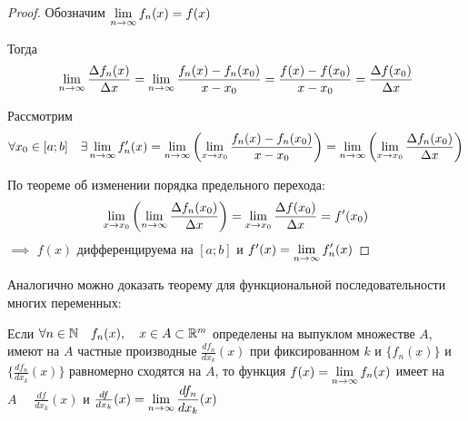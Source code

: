 \begin{proof}
    Обозначим $\displaystyle\lim_{n \to \infty} f_n(x) = f(x)$

    Тогда
    \[
        \displaystyle\lim_{n \to \infty} \frac{\Delta f_n(x)}{\Delta x}
        = \displaystyle\lim_{n \to \infty} \frac{f_n(x) - f_n(x_0)}{x - x_0}
        = \frac{f(x) - f(x_0)}{x - x_0} = \frac{\Delta f(x_0)}{\Delta x}
    \]

    Рассмотрим 
    \[
        \forall x_0 \in [a; b] \quad \exists \displaystyle\lim_{n \to \infty} f_n'(x)
        = \displaystyle\lim_{n \to \infty} \left( \displaystyle\lim_{x \to x_0} \frac{f_n(x) - f_n(x_0)}{x - x_0} \right)
        = \displaystyle\lim_{n \to \infty} \left( \displaystyle\lim_{x \to x_0} \frac{\Delta f_n(x_0)}{\Delta x} \right)
    \]

    По теореме об изменении порядка предельного перехода:
    \[
        \displaystyle\lim_{x \to x_0} \left( \displaystyle\lim_{n \to \infty} \frac{\Delta f_n(x_0)}{\Delta x} \right)
        = \displaystyle\lim_{x \to x_0} \frac{\Delta f(x_0)}{\Delta x} = f'(x_0)
    \]
    $\implies$ $f(x)$ дифференцируема на $[a; b]$ и $f'(x) = \displaystyle\lim_{n \to \infty} f_n'(x)$
\end{proof}

\begin{remark}
    Аналогично можно доказать теорему для функциональной последовательности
    многих переменных:

    Если $\forall n \in \mathbb{N} \quad f_n(x), \quad x \in A \subset \mathbb{R}^m$ определены на
    выпуклом множестве $A$, имеют на $A$ частные производные 
    $\frac{d f_n}{d x_k} (x)$ при фиксированном $k$ и
    $\{ f_n(x) \}$ и $\{ \frac{d f_n}{d x_k} (x) \}$ равномерно сходятся на
    $A$, то функция $f(x) = \displaystyle\lim_{n \to \infty} f_n(x)$ имеет на $A \quad$ 
    $\frac{df}{dx_k} (x)$ 
    и $\frac{df}{dx_k} (x) = \displaystyle\lim_{n \to \infty} \frac{df_n}{dx_k} (x)$ 
\end{remark}

